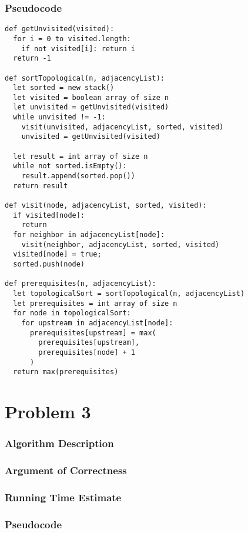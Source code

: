 \documentclass{math}
\begin{document}
\subsubsection*{Pseudocode}
\begin{lstlisting}
def getUnvisited(visited):
  for i = 0 to visited.length:
    if not visited[i]: return i
  return -1

def sortTopological(n, adjacencyList):
  let sorted = new stack()
  let visited = boolean array of size n
  let unvisited = getUnvisited(visited)
  while unvisited != -1:
    visit(unvisited, adjacencyList, sorted, visited)
    unvisited = getUnvisited(visited)

  let result = int array of size n
  while not sorted.isEmpty():
    result.append(sorted.pop())
  return result

def visit(node, adjacencyList, sorted, visited):
  if visited[node]:
    return
  for neighbor in adjacencyList[node]:
    visit(neighbor, adjacencyList, sorted, visited)
  visited[node] = true;
  sorted.push(node)

def prerequisites(n, adjacencyList):
  let topologicalSort = sortTopological(n, adjacencyList)
  let prerequisites = int array of size n
  for node in topologicalSort:
    for upstream in adjacencyList[node]:
      prerequisites[upstream] = max(
        prerequisites[upstream],
        prerequisites[node] + 1
      )
  return max(prerequisites)
\end{lstlisting}

\section*{Problem 3}

\subsubsection*{Algorithm Description}

\subsubsection*{Argument of Correctness}

\subsubsection*{Running Time Estimate}

\subsubsection*{Pseudocode}
\end{document}
